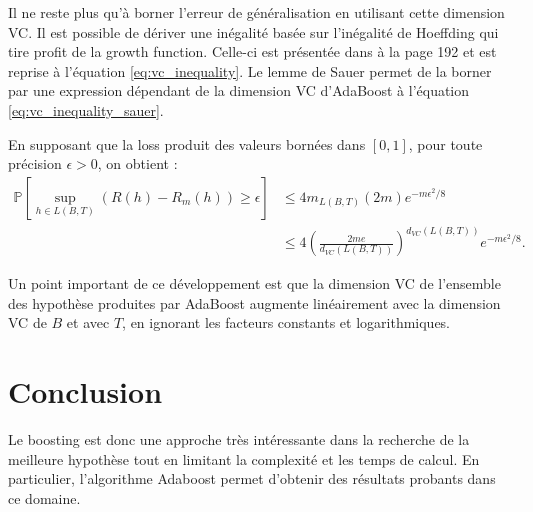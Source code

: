 \documentclass[12pt]{article}
\begin{document}
	Il ne reste plus qu'à borner l'erreur de généralisation en utilisant cette dimension VC.
	Il est possible de dériver une inégalité basée sur l'inégalité de Hoeffding qui tire profit de la growth function.
	Celle-ci est présentée dans \cite{Bousquet2003-oz} à la page 192 et est reprise à l'équation \ref{eq:vc_inequality}.
	Le lemme de Sauer permet de la borner par une expression dépendant de la dimension VC d'AdaBoost à l'équation \ref{eq:vc_inequality_sauer}.
	
	En supposant que la loss produit des valeurs bornées dans $[0, 1]$, pour toute précision $\epsilon > 0$, on obtient :
	\begin{align}
	\mathbb{P}\left[ \sup_{h \in L(B, T)} (R(h) - R_m(h)) \geq \epsilon \right] &\leq 4 m_{L(B, T)}(2 m) e^{-m \epsilon^2 / 8} \label{eq:vc_inequality} \\
	&\leq 4 \left( \frac{2 m e}{d_{VC}(L(B, T))} \right)^{d_{VC}(L(B, T))} e^{-m \epsilon^2 / 8}. \label{eq:vc_inequality_sauer}
	\end{align}

	Un point important de ce développement est que la dimension VC de l'ensemble des hypothèse produites par AdaBoost augmente linéairement avec la dimension VC de $B$ et avec $T$, en ignorant les facteurs constants et logarithmiques.
	
	\section{Conclusion}
	
	Le boosting est donc une approche très intéressante dans la recherche de la meilleure hypothèse tout en limitant la complexité et les temps de calcul. En particulier, l'algorithme Adaboost permet d'obtenir des résultats probants dans ce domaine. 	
	
	
	
	
\end{document}
